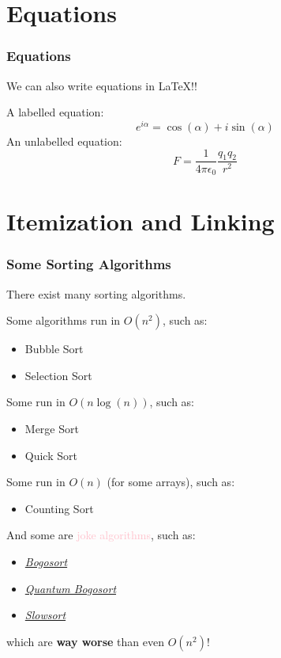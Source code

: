 \documentclass{beamer}
\begin{document}
    \section{Equations}
    {
        \begin{frame}
            \frametitle{Equations}
            We can also write equations in \LaTeX{}!!

            A labelled equation:
            \pause
            \begin{equation}
                e^{i\alpha} = \cos(\alpha) + i\sin(\alpha)
            \end{equation}
            \pause
            An unlabelled equation:
            \pause
            \begin{equation*}
                F = \frac{1}{4\pi\epsilon_{0}} \frac{q_{1}q_{2}}{r^{2}}
            \end{equation*}
        \end{frame}
    }

    \section{Itemization and Linking}
    {
        \begin{frame}
            \frametitle{Some Sorting Algorithms}
            There exist many sorting algorithms.
            \pause

            Some algorithms run in $O(n^{2})$, such as:
            \pause
            \begin{itemize}
                \item Bubble Sort
                \item Selection Sort
            \end{itemize}
            \pause
            Some run in $O(n\log(n))$, such as:
            \pause
            \begin{itemize}
                \item Merge Sort
                \item Quick Sort
            \end{itemize}
            \pause
            Some run in $O(n)$ (for some arrays), such as:
            \pause
            \begin{itemize}
                \item Counting Sort
            \end{itemize}
            \pause
            And some are \textcolor{pink}{joke algorithms}, such as:
            \begin{itemize}
                \item <8-> \textit{\href{https://en.wikipedia.org/wiki/Bogosort}{Bogosort}}
                \item <9-> \textit{\href{https://quantumcomputing.stackexchange.com/questions/1265/what-can-we-learn-from-quantum-bogosort}{Quantum Bogosort}}
                \item <10-> \textit{\href{https://en.wikipedia.org/wiki/Slowsort}{Slowsort}}
            \end{itemize}
            which are \textbf{way worse} than even $O(n^{2})$!
        \end{frame}
    }
\end{document}
